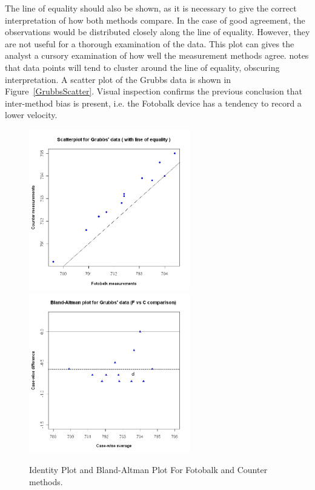 \documentclass[12pt, a4paper]{report}
\theoremstyle{plain}
\theoremstyle{definition}
\theoremstyle{remark}
\begin{document}
The line of equality should also be shown, as it is necessary to give the correct interpretation of how both methods compare. In the case of good agreement, the observations would be distributed closely along the line of equality. However, they are not useful for a thorough examination of the data. This plot can gives the analyst a cursory examination of how well the measurement methods agree. \citet{BritHypSoc} notes that data points will tend to cluster around the line of equality, obscuring interpretation. A scatter plot of the Grubbs data is shown in Figure~\ref{GrubbsScatter}. Visual inspection confirms the previous conclusion that inter-method bias is present, i.e. the Fotobalk device has a tendency to record a lower velocity.
	
	\begin{figure}[h!]
		\begin{center}
			\includegraphics[width=70mm]{images/GrubbsScatter.jpeg}				\includegraphics[width=70mm]{images/GrubbsBAplot-noLOA.jpeg}\\
				\caption{Identity Plot and Bland-Altman Plot For Fotobalk and Counter methods.}\label{GrubbsBA-noLOA}
			\end{center}
		\end{figure}
\end{document}
